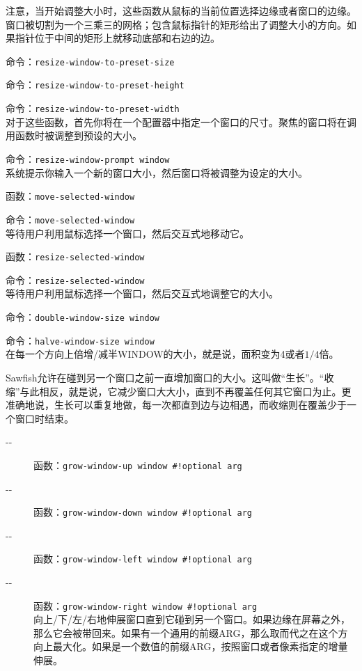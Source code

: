 \documentclass{book}
\begin{document}
\begin{CJK*}{UTF8}{gbsn}
\begin{description}
注意，当开始调整大小时，这些函数从鼠标的当前位置选择边缘或者窗口的边缘。窗口被切割为一个三乘三的网格；包含鼠标指针的矩形给出了调整大小的方向。如果指针位于中间的矩形上就移动底部和右边的边。
\item[-{}-] 命令：\verb|resize-window-to-preset-size|
\item[-{}-] 命令：\verb|resize-window-to-preset-height|
\item[-{}-] 命令：\verb|resize-window-to-preset-width|\\
对于这些函数，首先你将在一个配置器中指定一个窗口的尺寸。聚焦的窗口将在调用函数时被调整到预设的大小。
\item[-{}-] 命令：\verb|resize-window-prompt window|\\
系统提示你输入一个新的窗口大小，然后窗口将被调整为设定的大小。
\item[-{}-] 函数：\verb|move-selected-window|
\item[-{}-] 命令：\verb|move-selected-window|\\
等待用户利用鼠标选择一个窗口，然后交互式地移动它。
\item[-{}-] 函数：\verb|resize-selected-window|
\item[-{}-] 命令：\verb|resize-selected-window|\\
等待用户利用鼠标选择一个窗口，然后交互式地调整它的大小。
\item[-{}-] 命令：\verb|double-window-size window|
\item[-{}-] 命令：\verb|halve-window-size window|\\
在每一个方向上倍增/减半WINDOW的大小，就是说，面积变为4或者$1/4$倍。
\end{description}

Sawfish允许在碰到另一个窗口之前一直增加窗口的大小。这叫做``生长''。``收缩''与此相反，就是说，它减少窗口大大小，直到不再覆盖任何其它窗口为止。更准确地说，生长可以重复地做，每一次都直到边与边相遇，而收缩则在覆盖少于一个窗口时结束。
\begin{description}
\item[-{}-] 函数：\verb|grow-window-up window #!optional arg|
\item[-{}-] 函数：\verb|grow-window-down window #!optional arg|
\item[-{}-] 函数：\verb|grow-window-left window #!optional arg|
\item[-{}-] 函数：\verb|grow-window-right window #!optional arg|\\
向上/下/左/右地伸展窗口直到它碰到另一个窗口。如果边缘在屏幕之外，那么它会被带回来。如果有一个通用的前缀ARG，那么取而代之在这个方向上最大化。如果是一个数值的前缀ARG，按照窗口或者像素指定的增量伸展。


\end{description}
\end{CJK*}
\end{document}
